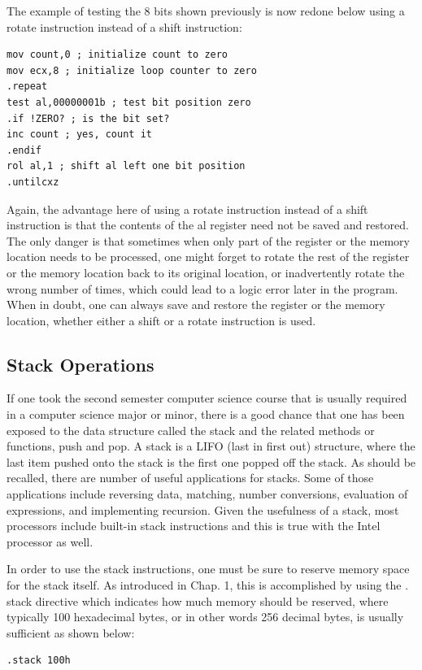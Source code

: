 \documentclass[10pt]{book}
\begin{document}
The example of testing the 8 bits shown previously is now redone below using a rotate instruction instead of a shift instruction:

\begin{verbatim}
mov count,0 ; initialize count to zero
mov ecx,8 ; initialize loop counter to zero
.repeat
test al,00000001b ; test bit position zero
.if !ZERO? ; is the bit set?
inc count ; yes, count it
.endif
rol al,1 ; shift al left one bit position
.untilcxz
\end{verbatim}

Again, the advantage here of using a rotate instruction instead of a shift instruction is that the contents of the al register need not be saved and restored. The only danger is that sometimes when only part of the register or the memory location needs to be processed, one might forget to rotate the rest of the register or the memory location back to its original location, or inadvertently rotate the wrong number of times, which could lead to a logic error later in the program. When in doubt, one can always save and restore the register or the memory location, whether either a shift or a rotate instruction is used.

\subsection{Stack Operations}
If one took the second semester computer science course that is usually required in a computer science major or minor, there is a good chance that one has been exposed to the data structure called the stack and the related methods or functions, push and pop. A stack is a LIFO (last in first out) structure, where the last item pushed onto the stack is the first one popped off the stack. As should be recalled, there are number of useful applications for stacks. Some of those applications include reversing data, matching, number conversions, evaluation of expressions, and implementing recursion. Given the usefulness of a stack, most processors include built-in stack instructions and this is true with the Intel processor as well.

In order to use the stack instructions, one must be sure to reserve memory space for the stack itself. As introduced in Chap. 1, this is accomplished by using the . stack directive which indicates how much memory should be reserved, where typically 100 hexadecimal bytes, or in other words 256 decimal bytes, is usually sufficient as shown below:

\begin{verbatim}
.stack 100h
\end{verbatim}
\end{document}
